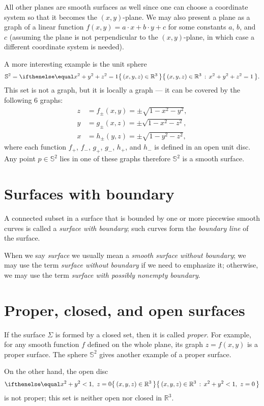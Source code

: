All other planes are smooth surfaces as well since one can choose a coordinate system so that it becomes the $(x,y)$-plane.
We may also present a plane as a graph of a linear function 
$f(x,y)=a\cdot x+b\cdot y+c$ for some constants $a$, $b$, and $c$
(assuming the plane is not perpendicular to the $(x,y)$-plane, in which case a different coordinate system is needed).

A more interesting example is the unit sphere 
\[\mathbb{S}^2=\set{(x,y,z)\in\mathbb{R}^3}{x^2+y^2+z^2=1}.\]
This set is not a graph,
but it is locally a graph ---
it can be covered by the following 6 graphs:
\begin{align*}
z&=f_\pm(x,y)=\pm \sqrt{1-x^2-y^2},
\\
y&=g_\pm(x,z)=\pm \sqrt{1-x^2-z^2},
\\
x&=h_\pm(y,z)=\pm \sqrt{1-y^2-z^2},
\end{align*}
where each function $f_+$, $f_-$, $g_+$, $g_-$, $h_+$, and $h_-$ is defined in an open unit disc.
Any point $p\in\mathbb{S}^2$ lies in one of these graphs therefore $\mathbb{S}^2$ is a smooth surface.

\section{Surfaces with boundary}
A connected subset in a surface that is bounded by one or more piecewise
smooth curves is called a \emph{surface with boundary}; such curves form the \emph{boundary line} of the surface.

When we say {}\emph{surface} we usually mean a {}\emph{smooth surface without boundary};
we may use the term {}\emph{surface without boundary} if we need to emphasize it;
otherwise, we may use the term {}\emph{surface with possibly nonempty boundary}.

\section{Proper, closed, and open surfaces}
If the surface $\Sigma$ is formed by a closed set, then it is called \emph{proper}.
For example, for any smooth function $f$ defined on the whole plane, its graph $z=f(x,y)$ is a proper surface.
The sphere $\mathbb{S}^2$ gives another example of a proper surface.

On the other hand, the open disc 
\[\set{(x,y,z)\in\mathbb{R}^3}{x^2+y^2<1,\  z=0}\]
is not proper; this set is neither open nor closed in $\mathbb{R}^3$.


